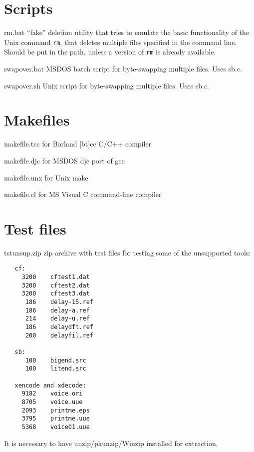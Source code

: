 \section{Scripts}

\begin{Descr}{40mm}
\item[rm.bat]
                ``fake'' deletion utility that tries to emulate the
        basic functionality of the Unix command {\tt rm}, that
        deletes multiple files specified in the command
        line. Should be put in the path, unless
        a version of {\tt rm} is already available.
\item[swapover.bat]
                MSDOS batch script for byte-swapping multiple
                files. Uses sb.c.
\item[swapover.sh]
                Unix script for byte-swapping multiple files. Uses sb.c.
\end{Descr}

\section{Makefiles}

\begin{Descr}{40mm}
\item[makefile.tcc] for Borland [bt]cc C/C++ compiler
\item[makefile.djc] for MSDOS djc port of gcc
\item[makefile.unx] for Unix make
\item[makefile.cl]      for MS Visual C command-line compiler
\end{Descr}


\section{Test files}

\begin{Descr}{40mm}
\item[tstunsup.zip]
                zip archive with test files for testing some of the
                unsupported tools: \\
        {\tt\begin{verbatim}
   cf:
     3200    cftest1.dat
     3200    cftest2.dat
     3200    cftest3.dat
      186    delay-15.ref
      186    delay-a.ref
      214    delay-u.ref
      186    delaydft.ref
      200    delayfil.ref

   sb:
      100    bigend.src
      100    litend.src

   xencode and xdecode:
     9182    voice.ori
     8705    voice.uue
     2093    printme.eps
     3795    printme.uue
     5368    voice01.uue
        \end{verbatim}}
                It is necessary to have unzip/pkunzip/Winzip installed
                for extraction.
\end{Descr}
